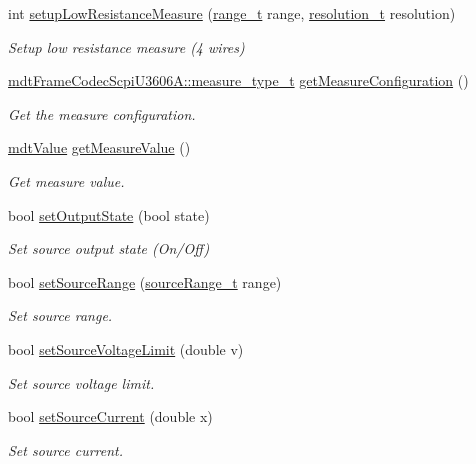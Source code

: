 \begin{DoxyCompactItemize}
int \hyperlink{classmdt_device_u3606_a_a3b5e1eaaae86bebdcc81ddbb95909628}{setup\-Low\-Resistance\-Measure} (\hyperlink{classmdt_device_u3606_a_ae05c254d19a66c1728d30100f7c600dc}{range\-\_\-t} range, \hyperlink{classmdt_device_u3606_a_a1899206163f2a0163d09cbc482daf806}{resolution\-\_\-t} resolution)
\begin{DoxyCompactList}\small\item\em Setup low resistance measure (4 wires) \end{DoxyCompactList}\item 
\hyperlink{classmdt_frame_codec_scpi_u3606_a_a3d7a1de14d77797a08e3d2991fa9f004}{mdt\-Frame\-Codec\-Scpi\-U3606\-A\-::measure\-\_\-type\-\_\-t} \hyperlink{classmdt_device_u3606_a_a8732ec3f4a04a191585191e1ba4f190d}{get\-Measure\-Configuration} ()
\begin{DoxyCompactList}\small\item\em Get the measure configuration. \end{DoxyCompactList}\item 
\hyperlink{classmdt_value}{mdt\-Value} \hyperlink{classmdt_device_u3606_a_ae75a1a896f905487d080761a2b8cf5a5}{get\-Measure\-Value} ()
\begin{DoxyCompactList}\small\item\em Get measure value. \end{DoxyCompactList}\item 
bool \hyperlink{classmdt_device_u3606_a_abdecce2f61926be3acffbd96aa83c497}{set\-Output\-State} (bool state)
\begin{DoxyCompactList}\small\item\em Set source output state (On/\-Off) \end{DoxyCompactList}\item 
bool \hyperlink{classmdt_device_u3606_a_abf5a2f29f4dad383ad03f33c9bc295bd}{set\-Source\-Range} (\hyperlink{classmdt_device_u3606_a_af53b326fef5d9e32a0149839b4319b1e}{source\-Range\-\_\-t} range)
\begin{DoxyCompactList}\small\item\em Set source range. \end{DoxyCompactList}\item 
bool \hyperlink{classmdt_device_u3606_a_a333740f79b57dd1d9135d0fa590d2680}{set\-Source\-Voltage\-Limit} (double v)
\begin{DoxyCompactList}\small\item\em Set source voltage limit. \end{DoxyCompactList}\item 
bool \hyperlink{classmdt_device_u3606_a_acee48f6f2fff3ba8b727b790b1ab65bf}{set\-Source\-Current} (double x)
\begin{DoxyCompactList}\small\item\em Set source current. \end{DoxyCompactList}\end{DoxyCompactItemize}
